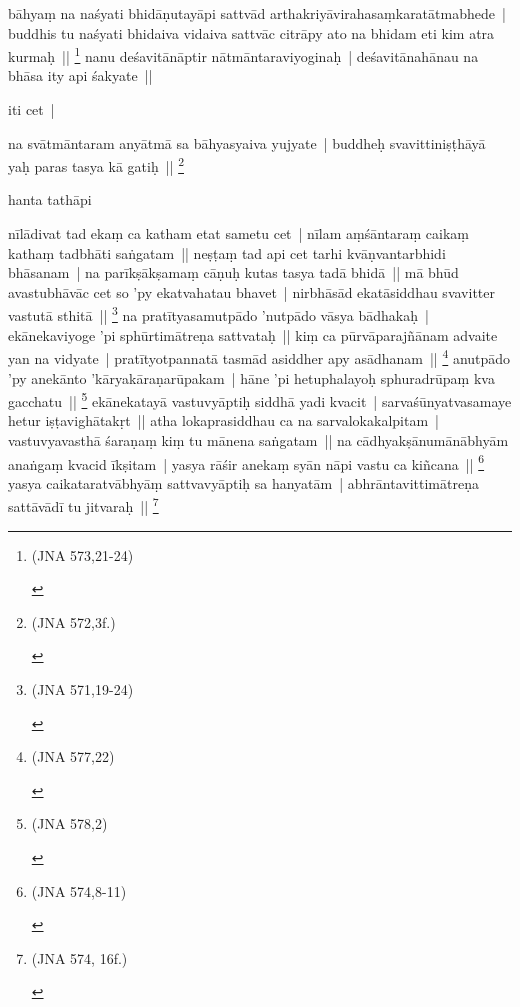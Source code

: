 \documentclass[article,12pt,a4paper]{memoir}
\begin{document}
	  \pstart bāhyaṃ na naśyati bhidāṇutayāpi sattvād arthakriyāvirahasaṃkaratātmabhede | buddhis tu naśyati bhidaiva vidaiva sattvāc citrāpy ato na bhidam eti kim atra kurmaḥ || \footnote{\begin{english}(JNA 573,21-24)\end{english}} nanu deśavitānāptir nātmāntaraviyoginaḥ | deśavitānahānau na bhāsa ity api śakyate ||
	\pend
      

	  \pstart iti cet |
	\pend
      

	  \pstart na svātmāntaram anyātmā sa bāhyasyaiva yujyate | buddheḥ svavittiniṣṭhāyā yaḥ paras tasya kā gatiḥ || \footnote{\begin{english}(JNA 572,3f.)\end{english}}
	\pend
      

	  \pstart hanta tathāpi
	\pend
      

	  \pstart nīlādivat tad ekaṃ ca katham etat sametu cet | nīlam aṃśāntaraṃ caikaṃ kathaṃ tadbhāti saṅgatam || neṣṭaṃ tad api cet tarhi kvāṇvantarbhidi bhāsanam | na parīkṣākṣamaṃ cāṇuḥ kutas tasya tadā bhidā || mā bhūd avastubhāvāc cet so 'py ekatvahatau bhavet | nirbhāsād ekatāsiddhau svavitter vastutā sthitā || \footnote{\begin{english}(JNA 571,19-24)\end{english}} na pratītyasamutpādo 'nutpādo vāsya bādhakaḥ | ekānekaviyoge 'pi sphūrtimātreṇa sattvataḥ || kiṃ ca pūrvāparajñānam advaite yan na vidyate | pratītyotpannatā tasmād asiddher apy asādhanam || \footnote{\begin{english}(JNA 577,22)\end{english}} anutpādo 'py anekānto 'kāryakāraṇarūpakam | hāne 'pi hetuphalayoḥ sphuradrūpaṃ kva gacchatu || \footnote{\begin{english}(JNA 578,2)\end{english}} ekānekatayā vastuvyāptiḥ siddhā yadi kvacit | sarvaśūnyatvasamaye hetur iṣṭavighātakṛt || atha lokaprasiddhau ca na sarvalokakalpitam | vastuvyavasthā śaraṇaṃ kiṃ tu mānena saṅgatam || na cādhyakṣānumānābhyām anaṅgaṃ kvacid īkṣitam | yasya rāśir anekaṃ syān nāpi vastu ca kiñcana || \footnote{\begin{english}(JNA 574,8-11)\end{english}} yasya caikataratvābhyāṃ sattvavyāptiḥ sa hanyatām | abhrāntavittimātreṇa sattāvādī tu jitvaraḥ || \footnote{\begin{english}(JNA 574, 16f.)\end{english}}
	\pend
      
\end{document}
